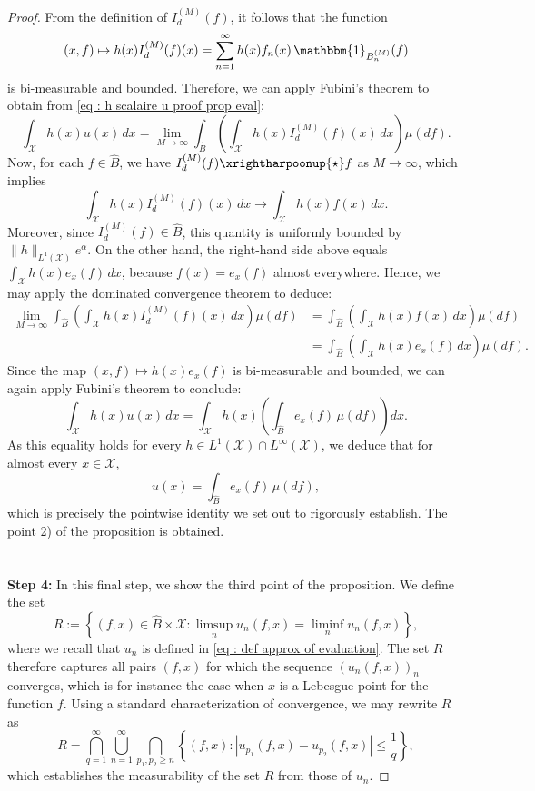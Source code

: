 \documentclass[a4paper, 11pt]{article}
\theoremstyle{definition}
\newcommand{\cX}{{\mathcal{X}}}
\begin{document}
{\begin{proof}
	From the definition of \( I_d^{(M)}(f) \), it follows that the function
	\[
	(x, f) \mapsto h(x) I_d^{(M)}(f)(x) = \sum_{n=1}^\infty h(x) f_n(x) \, \mathbbm{1}_{B_n^{(M)}}(f)
	\]
	is bi-measurable and bounded. Therefore, we can apply Fubini's theorem to obtain from \eqref{eq : h scalaire u proof prop eval}:
	\[
	\int_{\cX} h(x) u(x) \, dx=	\lim_{M \rightarrow \infty} \int_{\widehat{B}} \left( \int_{\cX } h(x) I_d^{(M)}(f)(x) \, dx \right) \mu(df).
	\]
	Now, for each \( f \in \widehat{B} \), we have \( I_d^{(M)}(f) \xrightharpoonup{\star} f \) as \( M \to \infty \), which implies
	\[
	\int_{\cX} h(x) I_d^{(M)}(f)(x) \, dx \longrightarrow \int_{\cX} h(x) f(x) \, dx.
	\]
	Moreover, since \( I_d^{(M)}(f) \in \widehat{B} \), this quantity is uniformly bounded by \( \|h\|_{L^1(\cX)} e^\alpha \). On the other hand, the right-hand side above equals \( \int_{\cX} h(x) e_x(f) \, dx \), because \( f(x) = e_x(f) \) almost everywhere.
	 Hence, we may apply the dominated convergence theorem to deduce:
	\begin{align*}
		\lim_{M \rightarrow \infty} \int_{\widehat{B}} \left( \int_{\cX} h(x) I_d^{(M)}(f)(x) \, dx \right) \mu(df) 
		&= \int_{\widehat{B}} \left( \int_{\cX} h(x) f(x) \, dx \right) \mu(df) \\
		&= \int_{\widehat{B}} \left( \int_{\cX} h(x) e_x(f) \, dx \right) \mu(df).
	\end{align*}
	Since the map \( (x, f) \mapsto h(x) e_x(f) \) is bi-measurable and bounded, we can again apply Fubini's theorem to conclude:
	\[
	\int_{\cX} h(x) u(x) \, dx = \int_{\cX} h(x) \left( \int_{\widehat{B}} e_x(f) \, \mu(df) \right) dx.
	\]
	As this equality holds for every \( h \in L^1(\cX) \cap 
	L^\infty(\cX) \), we deduce that for almost every \( x \in  \cX \),
	\[
	u(x) = \int_{\widehat{B}} e_x(f) \, \mu(df),
	\]
	which is precisely the pointwise identity we set out to rigorously establish. The point 2) of the proposition is obtained.
	\\
	\\
	\\
	\textbf{Step 4:} In this final step, we show the third point of the proposition.
	We define the set
		\[
		R := \left\{ (f,x) \in \widehat{B} \times \cX : \limsup_n u_n(f,x) = \liminf_n u_n(f,x) \right\},
		\]
		where we recall that $u_n$ is defined in \eqref{eq : def approx of evaluation}.
		The set \( R \) therefore captures all pairs \( (f,x) \) for which the sequence \( (u_n(f,x))_n \) converges, which is for instance the case when \( x \) is a Lebesgue point for the function \( f \). Using a standard characterization of convergence, we may rewrite \( R \) as
		\[
		R = \bigcap_{q=1}^{\infty} \bigcup_{n=1}^{\infty} \bigcap_{p_1,p_2 \geq n} \left\{ (f,x) : |u_{p_1}(f,x) - u_{p_2}(f,x)| \leq \frac{1}{q} \right\},
		\]
	which establishes the measurability of the set $R$ from those of $u_n$.
	

\end{proof}}
\end{document}
